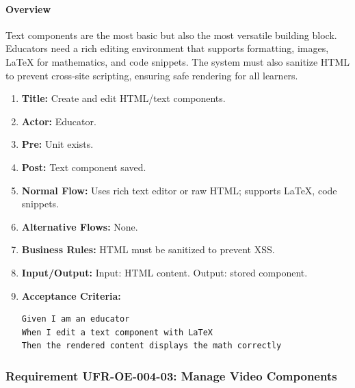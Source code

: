 \paragraph{Overview}
Text components are the most basic but also the most versatile building block. Educators need a rich editing environment that supports formatting, images, LaTeX for mathematics, and code snippets. The system must also sanitize HTML to prevent cross‑site scripting, ensuring safe rendering for all learners.
\begin{enumerate}[label=\textbf{\arabic*.}]
\item \textbf{Title:} Create and edit HTML/text components.
\item \textbf{Actor:} Educator.
\item \textbf{Pre:} Unit exists.
\item \textbf{Post:} Text component saved.
\item \textbf{Normal Flow:} Uses rich text editor or raw HTML; supports LaTeX, code snippets.
\item \textbf{Alternative Flows:} None.
\item \textbf{Business Rules:} HTML must be sanitized to prevent XSS.
\item \textbf{Input/Output:} Input: HTML content. Output: stored component.
\item \textbf{Acceptance Criteria:}
    \begin{verbatim}
Given I am an educator
When I edit a text component with LaTeX
Then the rendered content displays the math correctly
    \end{verbatim}
\end{enumerate}

\subsubsection{Requirement UFR-OE-004-03: Manage Video Components}
